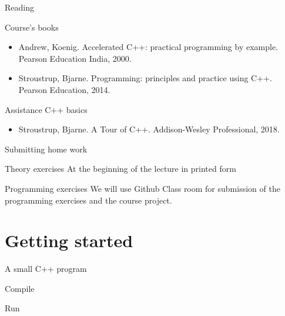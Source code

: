 \documentclass[12pt]{beamer}
\begin{document}
\begin{frame}{Reading}

\begin{block}{Course's books}
\begin{itemize}
\item Andrew, Koenig. Accelerated C++: practical programming by example. Pearson Education India, 2000.
\item Stroustrup, Bjarne. Programming: principles and practice using C++. Pearson Education, 2014.
\end{itemize}
\end{block}

\begin{block}{Assistance C++ basics }
\begin{itemize}
\item Stroustrup, Bjarne. A Tour of C++. Addison-Wesley Professional, 2018.
\end{itemize}
\end{block}
\end{frame}

\begin{frame}{Submitting home work}

\begin{block}{Theory exercises}
At the beginning of the lecture in printed form
\end{block}

\begin{block}{Programming exercises}
We will use Github Class room for submission of the programming exercises and the course project. 

\end{block}
\end{frame}



\section{Getting started}

\begin{frame}{A small C++ program}



\begin{block}{Compile}

\end{block}


\begin{block}{Run}

\end{block}


\end{frame}
\end{document}

